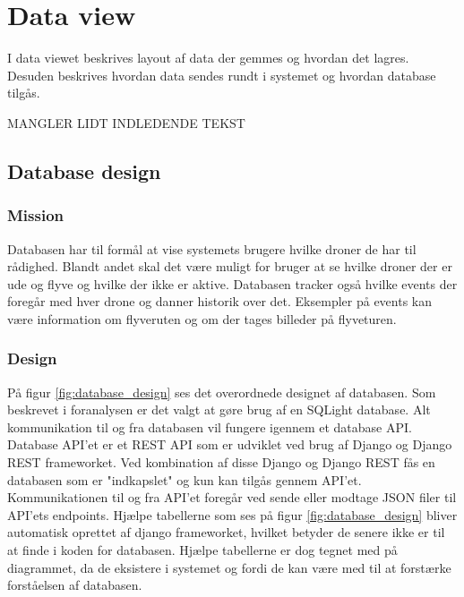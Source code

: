 \section{Data view}

I data viewet beskrives layout af data der gemmes og hvordan det lagres. Desuden beskrives hvordan data sendes rundt i systemet og hvordan database tilgås. 

MANGLER LIDT INDLEDENDE TEKST

\subsection{Database design}

\subsubsection*{Mission}
Databasen har til formål at vise systemets brugere hvilke droner de har til rådighed. Blandt andet skal det være muligt for bruger at se hvilke droner der er ude og flyve og hvilke der ikke er aktive. Databasen tracker også hvilke events der foregår med hver drone og danner historik over det. Eksempler på events kan være information om flyveruten og om der tages billeder på flyveturen.

\subsubsection*{Design}
På figur \ref{fig:database_design} ses det overordnede designet af databasen. Som beskrevet i foranalysen er det valgt at gøre brug af en SQLight database. Alt kommunikation til og fra databasen vil fungere igennem et database API. Database API'et er et REST API som er udviklet ved brug af Django og Django REST frameworket. Ved kombination af disse Django og Django REST fås en databasen som er "indkapslet" og kun kan tilgås gennem API'et. Kommunikationen til og fra API'et foregår ved sende eller modtage JSON filer til API'ets endpoints. Hjælpe tabellerne som ses på figur \ref{fig:database_design} bliver automatisk oprettet af django frameworket, hvilket betyder de senere ikke er til at finde i koden for databasen. Hjælpe tabellerne er dog tegnet med på diagrammet, da de eksistere i systemet og fordi de kan være med til at forstærke forståelsen af databasen. 


